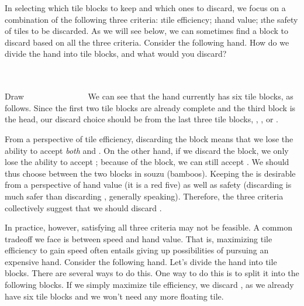 \bigskip
In selecting which tile blocks to keep and which ones to discard, we focus on a combination of the following three criteria:
\be
\i tile efficiency;
\i hand value;
\i the safety of tiles to be discarded.
\ee
As we will see below, we can sometimes find a block to discard based on all the three criteria.
Consider the following hand. How do we divide the hand into tile blocks, and what would you discard?

\bp
{}\\ \vspace{-16pt}
\rfs{}~\\
\hfill\footnotesize{Draw~~~~~~~~~~~~~~~}
\ep
We can see that the hand currently has six tile blocks, as follows.
\emj
Since the first two tile blocks are already complete and the third block is the head, our discard choice should be from the last three tile blocks, {\LARGE{}}, {\LARGE{}\rfs}, or {\LARGE{}}.

\bigskip
From a perspective of tile efficiency, discarding the {\LARGE{}} block means that we lose the ability to accept \emph{both} {\LARGE{}} and {\LARGE{}}. On the other hand, if we discard the {\LARGE{}} block, we only lose the ability to accept {\LARGE{}}; because of the {\LARGE{}\rfs} block, we can still accept {\LARGE{}}. We should thus choose between the two blocks in {\jap souzu} (bamboos).
Keeping the {\LARGE\rfs} is desirable from a perspective of hand value (it is a red five) as well as safety (discarding {\LARGE{}} is much safer than discarding {\LARGE{}\rfs}, generally speaking). Therefore, the three criteria collectively suggest that we should discard {\LARGE{}}.

\bigskip

In practice, however, satisfying all three criteria may not be feasible. A common tradeoff we face is between speed and hand value. That is, maximizing tile efficiency to gain speed often entails giving up possibilities of pursuing an expensive hand. Consider the following hand.
\bp
{}
\ep
Let's divide the hand into tile blocks. There are several ways to do this. One way to do this is to split it into the following blocks.
\emj
If we simply maximize tile efficiency, we discard {\LARGE{}}, as we already have six tile blocks and we won't need any more floating tile.

